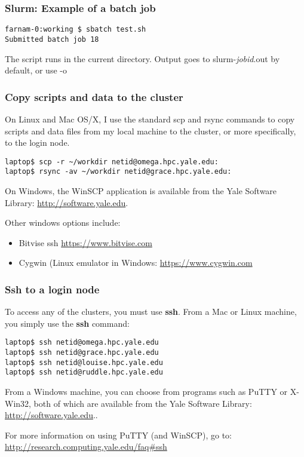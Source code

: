\documentclass[10pt]{beamer}
\begin{document}
\begin{frame}[fragile]
\frametitle{Slurm: Example of a batch job}
\begin{verbatim}
farnam-0:working $ sbatch test.sh
Submitted batch job 18
\end{verbatim}
\vskip14pt
The script runs in the current directory.  
Output goes to slurm-\textit{jobid}.out by default, or use -o
\end{frame}



\begin{frame}[fragile]
\frametitle{Copy scripts and data to the cluster}
On Linux and Mac OS/X, I use the standard scp and rsync commands
to copy scripts and data files from my local machine to the cluster,
or more specifically, to the login node.

\begin{verbatim}
laptop$ scp -r ~/workdir netid@omega.hpc.yale.edu:
laptop$ rsync -av ~/workdir netid@grace.hpc.yale.edu:
\end{verbatim}

On Windows, the WinSCP application is available from the Yale Software
Library: \url{http://software.yale.edu}.

\vskip10pt
Other windows options include:

\begin{itemize}
\item{Bitvise ssh \url{https://www.bitvise.com}}
\item{Cygwin (Linux emulator in Windows: \url{https://www.cygwin.com}}
\end{itemize}

\end{frame}

\begin{frame}[fragile]
\frametitle{Ssh to a login node}
To access any of the clusters, you must use \textbf{ssh}.
From a Mac or Linux machine, you simply use the \textbf{ssh} command:

\begin{verbatim}
laptop$ ssh netid@omega.hpc.yale.edu
laptop$ ssh netid@grace.hpc.yale.edu
laptop$ ssh netid@louise.hpc.yale.edu
laptop$ ssh netid@ruddle.hpc.yale.edu
\end{verbatim}

From a Windows machine, you can choose from programs such as PuTTY or
X-Win32, both of which are available from the Yale Software Library:
\url{http://software.yale.edu}..

\vskip10pt
For more information on using PuTTY (and WinSCP), go to:
\url{http://research.computing.yale.edu/faq\#ssh}
\end{frame}
\end{document}
